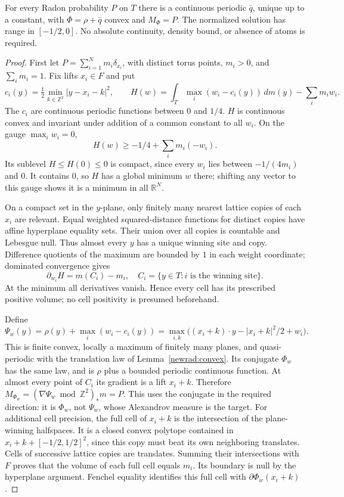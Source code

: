\begin{theorem}\label{newrad:realexist}
For every Radon probability $P$ on $T$ there is a continuous periodic
$\bar q$, unique up to a constant, with $\Phi=\rho+\bar q$ convex
and $M_\Phi=P$. The normalized solution has range in $[-1/2,0]$.
No absolute continuity, density bound, or absence of atoms is required.
\end{theorem}
\begin{proof}
First let $P=\sum_{i=1}^N m_i\delta_{x_i}$, with distinct torus
points, $m_i>0$, and $\sum_i m_i=1$. Fix lifts $x_i\in F$ and put
\[
 c_i(y)=\tfrac12\min_{k\in\mathbb Z^2}|y-x_i-k|^2,
 \qquad H(w)=\int_T\max_i(w_i-c_i(y))\,dm(y)-\sum_i m_iw_i.
\]
The $c_i$ are continuous periodic functions between $0$ and $1/4$.
$H$ is continuous convex and invariant under addition of a common
constant to all $w_i$. On the gauge $\max_i w_i=0$,
\[
 H(w)\ge-1/4+\sum_i m_i(-w_i).
\]
Its sublevel $H\le H(0)\le0$ is compact, since every $w_i$ lies
between $-1/(4m_i)$ and $0$. It contains $0$, so $H$ has a global
minimum $w$ there; shifting any vector to this gauge shows it is a
minimum in all $\mathbb R^N$.

On a compact set in the $y$-plane, only finitely many nearest lattice
copies of each $x_i$ are relevant. Equal weighted squared-distance
functions for distinct copies have affine hyperplane equality sets.
Their union over all copies is countable and Lebesgue null. Thus
almost every $y$ has a unique winning site and copy. Difference
quotients of the maximum are bounded by $1$ in each weight coordinate;
dominated convergence gives
\[
 \partial_{w_i}H= m(C_i)-m_i,
 \quad C_i=\{y\in T:i\text{ is the winning site}\}.
\]
At the minimum all derivatives vanish. Hence every cell has its
prescribed positive volume; no cell positivity is presumed beforehand.

Define
\[
 \Psi_w(y)=\rho(y)+\max_i(w_i-c_i(y))
 =\max_{i,k}\big((x_i+k)\cdot y-|x_i+k|^2/2+w_i\big).
\]
This is finite convex, locally a maximum of finitely many planes, and
quasi-periodic with the translation law of Lemma~\ref{newrad:convex}.
Its conjugate $\Phi_w$ has the same law, and is $\rho$ plus a bounded
periodic continuous function. At almost every point of $C_i$ its
gradient is a lift $x_i+k$. Therefore
$M_{\Phi_w}=(\nabla\Psi_w\bmod\mathbb Z^2)_*m=P$.
This uses the conjugate in the required direction: it is $\Phi_w$,
not $\Psi_w$, whose Alexandrov measure is the target.
For additional cell precision, the full cell of $x_i+k$ is the
intersection of the plane-winning halfspaces. It is a closed convex
polytope contained in $x_i+k+[-1/2,1/2]^2$, since this copy must beat
its own neighboring translates. Cells of successive lattice copies
are translates. Summing their intersections with $F$ proves that the
volume of each full cell equals $m_i$. Its boundary is null by the
hyperplane argument. Fenchel equality identifies this full cell with
$\partial\Phi_w(x_i+k)$.


\end{proof}
